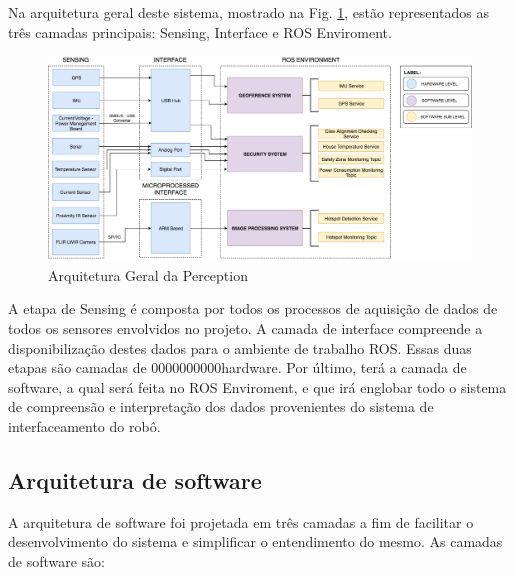 Na arquitetura geral deste sistema, mostrado na Fig. \ref{arqgeral}, estão representados as três camadas principais: Sensing, Interface e ROS Enviroment.

\begin{figure}[!ht]
\centering
\includegraphics[width=15cm]{Figures/ArquiteturaPerceptionv2.png}
\caption{Arquitetura Geral da Perception}\label{arqgeral}
\end{figure}

 A etapa de Sensing é composta por todos os processos de aquisição de dados de todos os sensores envolvidos no projeto. A camada de interface compreende a disponibilização destes dados para o ambiente de trabalho ROS. Essas duas etapas são camadas de 0000000000hardware. Por último, terá a camada de software, a qual será feita no ROS Enviroment, e que irá englobar todo o sistema de compreensão e interpretação dos dados provenientes do sistema de interfaceamento do robô.
 
\subsection{Arquitetura de software}

A arquitetura de software foi projetada em três camadas a fim de facilitar o desenvolvimento do sistema e simplificar o entendimento do mesmo. As camadas de software são:


